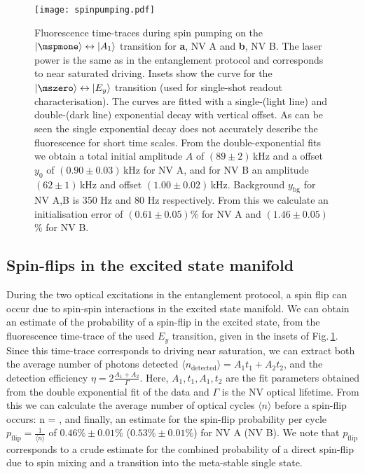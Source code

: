 \begin{figure}[h]
\centering
\texttt{[image: spinpumping.pdf]}
\caption{Fluorescence time-traces during spin pumping on the $\ket{\mspmone}\leftrightarrow\ket{A_1}$ transition for \textbf{a}, NV A and \textbf{b}, NV B. The laser power is the same as in the entanglement protocol and corresponds to near saturated driving. Insets show the curve for the $\ket{\mszero}\leftrightarrow\ket{E_y}$ transition (used for single-shot readout characterisation). The curves are fitted with a single-(light line) and double-(dark line) exponential decay with vertical offset. As can be seen the single exponential decay does not accurately describe the fluorescence for short time scales. From the double-exponential fits we obtain a total initial amplitude $A$ of $(89 \pm 2)$\,kHz and a offset $y_0$ of $(0.90 \pm 0.03)$\,kHz for NV A, and for NV B an amplitude $(62 \pm 1)$\,kHz and offset $(1.00 \pm 0.02)$\,kHz. Background $y_{\mathrm{bg}}$ for NV A,B is 350 Hz and 80 Hz respectively. From this we calculate an initialisation error of $(0.61 \pm 0.05)$\% for NV A and $(1.46 \pm 0.05)$\% for NV B. }
\label{fig:spinpumping}
\end{figure}

\subsection{Spin-flips in the excited state manifold}
During the two optical excitations in the entanglement protocol, a spin flip can occur due to spin-spin interactions in the excited state manifold. We can obtain an estimate of the probability of a spin-flip in the excited state, from the fluorescence time-trace of the used $E_y$ transition, given in the insets of Fig.\,\ref{fig:spinpumping}. Since this time-trace corresponds to driving near saturation, we can extract both the average number of photons detected $\langle n_{\text{detected}} \rangle = A_1 t_1 + A_2 t_2 $, and the detection efficiency $\eta = 2\frac{A_1+A_2}{\Gamma}$. Here, $A_1,t_1,A_1,t_2$ are the fit parameters obtained from the double exponential fit of the data and $\Gamma$ is the NV optical lifetime. From this we can calculate the average number of optical cycles $\langle n \rangle$ before a spin-flip occurs:
\be
\langle n \rangle = ,
\ee
and finally, an estimate for the spin-flip probability per cycle $p_{\text{flip}}=\frac{1}{\langle n \rangle}$ of $0.46 \% \pm 0.01\%$ ($0.53\% \pm 0.01\%$) for NV A (NV B). We note that $p_{\text{flip}}$ corresponds to a crude estimate for the combined probability of a direct spin-flip due to spin mixing and a transition into the meta-stable single state. 

